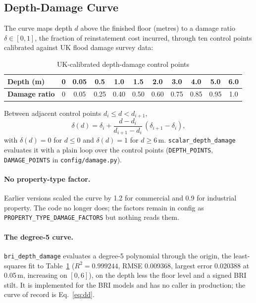 \documentclass[11pt,a4paper]{article}
\begin{document}
\subsection{Depth-Damage Curve}
\label{sec:dd}

The curve maps depth $d$ above the finished floor (metres) to a damage ratio
$\delta\in[0,1]$, the fraction of reinstatement cost incurred, through ten control points
calibrated against UK flood damage survey data:

\begin{table}[H]
\centering
\begin{tabular}{lcccccccccc}
    \toprule
    \textbf{Depth (m)} & 0 & 0.05 & 0.5 & 1.0 & 1.5 & 2.0 & 3.0 & 4.0 & 5.0 & 6.0 \\
    \midrule
    \textbf{Damage ratio} & 0 & 0.05 & 0.25 & 0.40 & 0.50 & 0.60 & 0.75 & 0.85 & 0.95 & 1.0 \\
    \bottomrule
\end{tabular}
\caption{UK-calibrated depth-damage control points}
\label{tab:dd_control}
\end{table}

Between adjacent control points $d_i\le d<d_{i+1}$,
\begin{equation}
    \delta(d) = \delta_i + \frac{d - d_i}{d_{i+1} - d_i} \, (\delta_{i+1} - \delta_i),
    \label{eq:dd}
\end{equation}
with $\delta(d)=0$ for $d\le0$ and $\delta(d)=1$ for $d\ge6$\,m.
\texttt{scalar\_depth\_damage} evaluates it with a plain loop over the control points
(\texttt{DEPTH\_POINTS}, \texttt{DAMAGE\_POINTS} in \texttt{config/damage.py}).

\paragraph{No property-type factor.} Earlier versions scaled the curve by 1.2 for
commercial and 0.9 for industrial property. The code no longer does; the factors remain
in config as \texttt{PROPERTY\_TYPE\_DAMAGE\_FACTORS} but nothing reads them.

\paragraph{The degree-5 curve.} \texttt{bri\_depth\_damage} evaluates a degree-5
polynomial through the origin, the least-squares fit to Table~\ref{tab:dd_control}
($R^2=0.999244$, RMSE 0.009368, largest error 0.020388 at 0.05\,m, increasing on
$[0,6]$), on the depth less the floor level and a signed BRI stilt. It is implemented for
the BRI models and has no caller in production; the curve of record is
Eq.~\eqref{eq:dd}.
\end{document}
